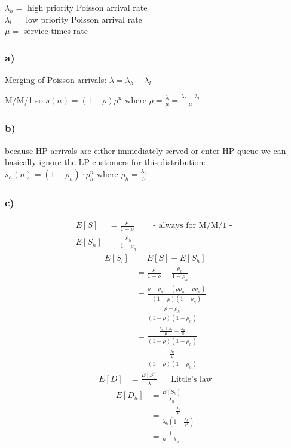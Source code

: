$\lambda _{h}=$ high priority Poisson arrival rate\\
$\lambda _{l}=$ low priority Poisson arrival rate\\
$\mu =$ service times rate

\subsubsection*{ a) }

Merging of Poisson arrivals:
$\lambda =\lambda _{h}+\lambda _{l}$

M/M/1 so $s\left(n\right)=\left(1-\rho \right)\rho ^{n}$ where $\rho =\frac{\lambda }{\mu }=\frac{\lambda _{h}+\lambda _{l}}{\mu }$

\subsubsection*{ b) }

because HP arrivals are either immediately served or enter HP queue we can basically ignore the LP customers for this distribution:\\
$s_{h}\left(n\right)=\left(1-\rho _{h}\right)\cdot \rho _{h}^{n}$ where $\rho _{h}=\frac{\lambda _{h}}{\mu }$

\subsubsection*{ c) }
\begin{align*}
E\left[S\right]&=\frac{\rho }{1-\rho } && \text{ - always for M/M/1 - }\\
E\left[S_{h}\right]&=\frac{\rho _{h}}{1-\rho _{h}}
\end{align*}
\begin{align*}
E\left[S_{l}\right]&=E\left[S\right]-E\left[S_{h}\right]\\
&=\frac{\rho }{1-\rho }-\frac{\rho _{h}}{1-\rho _{h}}\\
&=\frac{\rho -\rho _{h} + (\rho \rho_h - \rho \rho_h)}{\left(1-\rho \right)\left(1-\rho _{h}\right)}\\
&=\frac{\rho -\rho _{h}}{\left(1-\rho \right)\left(1-\rho _{h}\right)}\\
&=\frac{\frac{\lambda _{h}+\lambda _{l}}{\mu }-\frac{\lambda _{h}}{\mu }}{\left(1-\rho \right)\left(1-\rho _{h}\right)}\\
&=\frac{\frac{\lambda _{l}}{\mu }}{\left(1-\rho \right)\left(1-\rho _{h}\right)}
\end{align*}
\begin{align*}
E\left[D\right]&=\frac{E\left[S\right]}{\lambda } && \text{Little's law}
\end{align*}
\begin{align*}
E\left[D_{h}\right]&=\frac{E\left[S_{h}\right]}{\lambda _{h}}\\
&=\frac{\frac{\lambda _{h}}{\mu }}{\lambda _{h}\left(1-\frac{\lambda _{h}}{\mu }\right)}\\
&=\frac{1}{\mu -\lambda _{h}}
\end{align*}

